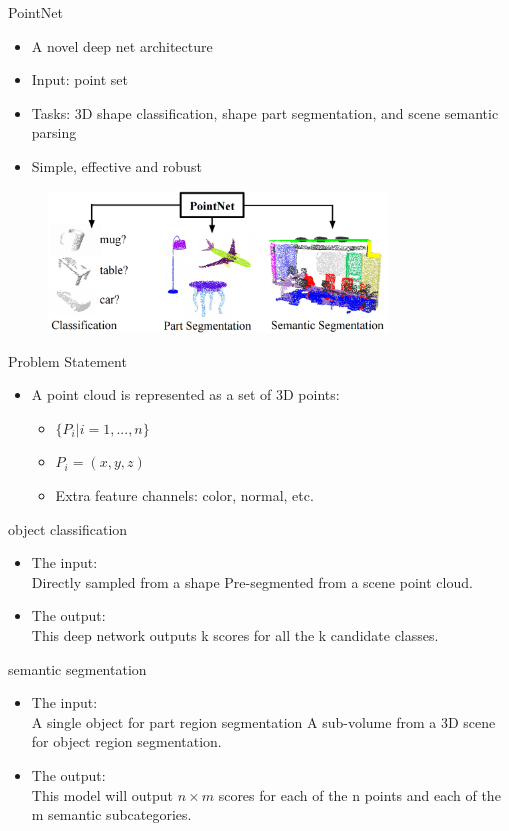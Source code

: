 \documentclass[serif,mathserif]{beamer}
\begin{document}
\begin{frame}{PointNet}
	\begin{itemize}
		\item A novel deep net architecture
		\item Input: point set
		\item Tasks: 3D shape classification, shape part segmentation, and scene semantic parsing 
		\item Simple, effective and robust
	\end{itemize}
	\begin{figure}
		\includegraphics[width=9cm]{image/teaser.png}
	\end{figure}
\end{frame}

\begin{frame}{Problem Statement}
	\begin{itemize}
		\item A point cloud is represented as a set of 3D points:  
		\begin{itemize}
			\item $ \{P_i | i = 1,...,n\} $
			\item $ P_i = (x, y, z) $
			\item Extra feature channels: color, normal, etc.
		\end{itemize}
	\end{itemize}
\end{frame}

\begin{frame}{object classification}
	\begin{itemize}
		\item The input: \\
		Directly sampled from a shape
		Pre-segmented from a scene point cloud. 
		\item The output: \\
		This deep network outputs k scores for all the k candidate classes.
	\end{itemize}
\end{frame}

\begin{frame}{semantic segmentation}
	\begin{itemize}
		\item The input: \\
		A single object for part region segmentation
		A sub-volume from a 3D scene for object region segmentation.
		\item The output: \\
		This model will output $ n \times m $ scores for each of the n points and each of the m semantic    
		subcategories.
	\end{itemize}
\end{frame}
\end{document}
